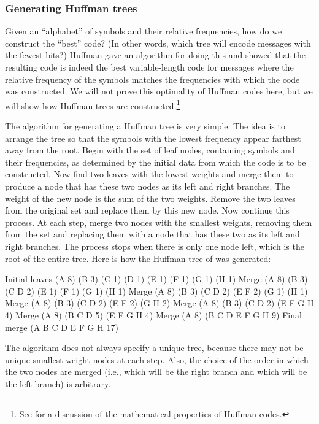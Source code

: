 \subsubsection*{Generating Huffman trees}

Given an ``alphabet'' of symbols and their relative frequencies, how do we
construct the ``best'' code?  (In other words, which tree will encode messages
with the fewest bits?)  Huffman gave an algorithm for doing this and showed
that the resulting code is indeed the best variable-length code for messages
where the relative frequency of the symbols matches the frequencies with which
the code was constructed.  We will not prove this optimality of Huffman codes
here, but we will show how Huffman trees are constructed.\footnote{See 
for a discussion of the mathematical properties of Huffman codes.}

The algorithm for generating a Huffman tree is very simple. The idea is to
arrange the tree so that the symbols with the lowest frequency appear farthest
away from the root. Begin with the set of leaf nodes, containing symbols and
their frequencies, as determined by the initial data from which the code is to
be constructed. Now find two leaves with the lowest weights and merge them to
produce a node that has these two nodes as its left and right branches. The
weight of the new node is the sum of the two weights. Remove the two leaves
from the original set and replace them by this new node. Now continue this
process. At each step, merge two nodes with the smallest weights, removing them
from the set and replacing them with a node that has these two as its left and
right branches. The process stops when there is only one node left, which is
the root of the entire tree.  Here is how the Huffman tree of 
was generated:

\begin{example}
Initial leaves  {(A 8) (B 3) (C 1) (D 1) (E 1) (F 1) (G 1) (H 1)}
         Merge  {(A 8) (B 3) ({C D} 2) (E 1) (F 1) (G 1) (H 1)}
         Merge  {(A 8) (B 3) ({C D} 2) ({E F} 2) (G 1) (H 1)}
         Merge  {(A 8) (B 3) ({C D} 2) ({E F} 2) ({G H} 2)}
         Merge  {(A 8) (B 3) ({C D} 2) ({E F G H} 4)}
         Merge  {(A 8) ({B C D} 5) ({E F G H} 4)}
         Merge  {(A 8) ({B C D E F G H} 9)}
   Final merge  {({A B C D E F G H} 17)}
\end{example}

\noindent
The algorithm does not always specify a unique tree, because there may not be
unique smallest-weight nodes at each step.  Also, the choice of the order in
which the two nodes are merged (i.e., which will be the right branch and which
will be the left branch) is arbitrary.

